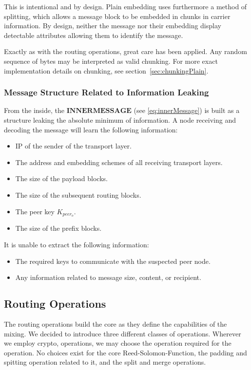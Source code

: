 This is intentional and by design. Plain embedding uses furthermore a method of splitting, which allows a message block to be embedded in chunks in carrier information. By design, neither the message nor their embedding display detectable attributes allowing them to identify the message. 

Exactly as with the routing operations, great care has been applied. Any random sequence of bytes may be interpreted as valid chunking. For more exact implementation details on chunking, see section~\ref{sec:chunkingPlain}.

\subsubsection{Message Structure Related to Information Leaking}
From the inside, the $\mathbf{INNERMESSAGE}$ (see \ref{eq:innerMessage}) is built as a structure leaking the absolute minimum of information. A node receiving and decoding the message will learn the following information:
\begin{itemize}
	\item IP of the sender of the transport layer.
	\item The address and embedding schemes of all receiving transport layers.
	\item The size of the payload blocks.
	\item The size of the subsequent routing blocks.
	\item The peer key $K_{peer_o}$.
	\item The size of the prefix blocks.
\end{itemize}

It is unable to extract the following information:
\begin{itemize}
	\item The required keys to communicate with the suspected peer node.
	\item Any information related to message size, content, or recipient.
\end{itemize}

\subsection{Routing Operations\label{sec:operations}}
The routing operations build the core as they define the capabilities of the mixing. We decided to introduce three different classes of operations. Wherever we employ crypto, operations, we may choose the operation required for the operation. No choices exist for the core Reed-Solomon-Function, the padding and spitting operation related to it, and the split and merge operations.

